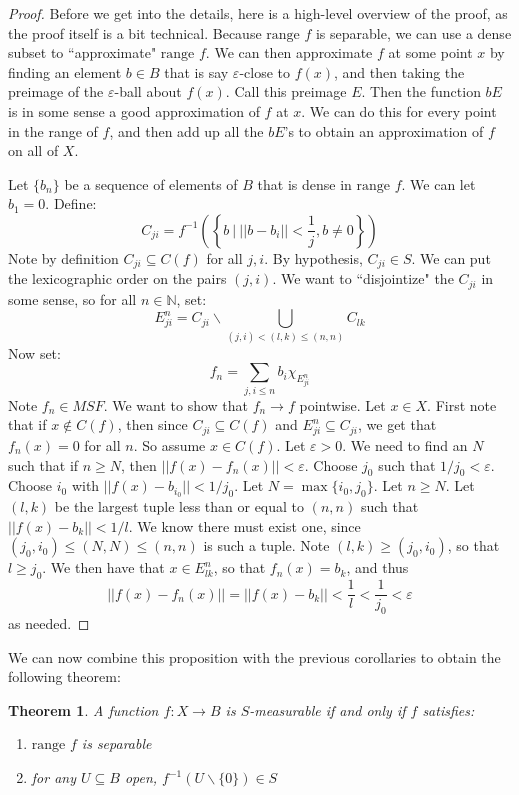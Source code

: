 \documentclass[a4paper,12pt]{report}
\newcommand{\range}{ \text{range } }
\newcommand{\inv}[1] { #1^{-1} }
\newcommand{\varep}{ \varepsilon }
\newcommand{\sse} {\subseteq}
\newtheorem{theorem}{Theorem}[section]
\begin{document}
	\begin{proof}
	Before we get into the details, here is a high-level overview of the proof, as the proof itself is a bit technical. Because $\range f$ is separable, we can use a dense subset to ``approximate" $\range f$. We can then approximate $f$ at some point $x$ by finding an element $b \in B$ that is say $\varep$-close to $f(x)$, and then taking the preimage of the $\varep$-ball about $f(x)$. Call this preimage $E$. Then the function $bE$ is in some sense a good approximation of $f$ at $x$. We can do this for every point in the range of $f$, and then add up all the $bE$'s to obtain an approximation of $f$ on all of $X$. 
	
	Let $\{b_n\}$ be a sequence of elements of $B$ that is dense in $\range f$. We can let $b_1 = 0$. Define:
	\[ C_{ji} = \inv{f}\left( \left\{b ~\bigg|~ ||b - b_i|| < \frac{1}{j}, b \neq 0 \right\}\right) \]
	Note by definition $C_{ji} \sse C(f)$ for all $j, i$. By hypothesis, $C_{ji} \in S$. We can put the lexicographic order on the pairs $(j, i)$. We want to ``disjointize" the $C_{ji}$ in some sense, so for all $n \in \mathbb{N}$, set:
	\[ E_{ji}^n = C_{ji} \backslash \bigcup_{(j, i) < (l, k) \leq (n, n)} C_{lk} \]
	Now set:
	\[ f_n = \sum_{j, i \leq n} b_i \chi_{E_{ji}^n} \]
	Note $f_n \in MSF$. We want to show that $f_n \rightarrow f$ pointwise. Let $x \in X$. First note that if $x \notin C(f)$, then since $C_{ji} \sse C(f)$ and $E_{ji}^n \sse C_{ji}$, we get that $f_n(x) = 0$ for all $n$. So assume $x \in C(f)$. Let $\varep > 0$. We need to find an $N$ such that if $n \geq N$, then $||f(x) - f_n(x)|| < \varep$. Choose $j_0$ such that $1 / j_0 < \varep$. Choose $i_0$ with $||f(x) - b_{i_0}||< 1/j_0$. Let $N = \max\{i_0, j_0\}$. Let $n \geq N$. Let $(l, k)$ be the largest tuple less than or equal to $(n, n)$ such that $||f(x) - b_k|| < 1 / l$. We know there must exist one, since $(j_0, i_0) \leq (N, N) \leq (n, n)$ is such a tuple. Note $(l, k) \geq (j_0, i_0)$, so that $l \geq j_0$. We then have that $x \in E_{lk}^n$, so that $f_n(x) = b_k$, and thus 
	\[ ||f(x) - f_n(x)|| = ||f(x) - b_k|| < \frac{1}{l} < \frac{1}{j_0} < \varep \] 
	as needed. 
	\end{proof}
	
	\noindent We can now combine this proposition with the previous corollaries to obtain the following theorem:
	\begin{theorem}
	A function $f : X \rightarrow B$ is $S$-measurable if and only if $f$ satisfies:
		\begin{enumerate}[label=(\alph*)]
			\item $\range f$ is separable
			\item for any $U \sse B$ open, $\inv{f}(U \backslash \{0\}) \in S$
		\end{enumerate}
	\end{theorem}	
	
\end{document}
